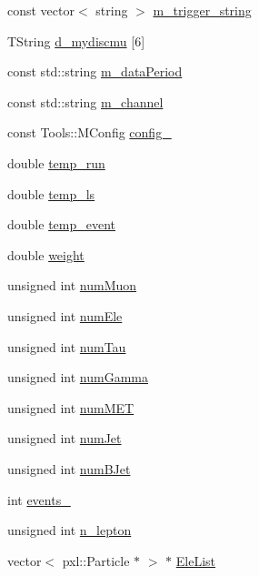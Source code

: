\begin{DoxyCompactItemize}
const vector$<$ string $>$ \hyperlink{classspecialAna_a4e5b506555aa75a4b132df95398a5ae5}{m\-\_\-trigger\-\_\-string}
\item 
T\-String \hyperlink{classspecialAna_a8bd00db3975c79baf92da5f720cca2fc}{d\-\_\-mydiscmu} \mbox{[}6\mbox{]}
\item 
const std\-::string \hyperlink{classspecialAna_a5962acc8cee4aa0fdb0f01caab08dd22}{m\-\_\-data\-Period}
\item 
const std\-::string \hyperlink{classspecialAna_a71e9557d5927332677564f33668e8c80}{m\-\_\-channel}
\item 
const Tools\-::\-M\-Config \hyperlink{classspecialAna_a1e76bd61bb4a97d99729f398674e14e2}{config\-\_\-}
\item 
double \hyperlink{classspecialAna_a739ec443ba622f962854c133080624db}{temp\-\_\-run}
\item 
double \hyperlink{classspecialAna_ad1c4dd4e6eb56e86c4ad24b8f942ebef}{temp\-\_\-ls}
\item 
double \hyperlink{classspecialAna_a70360bfdefab8b0cdfd126e40d109c34}{temp\-\_\-event}
\item 
double \hyperlink{classspecialAna_a093be544141cb52a9b5a1f5ef3bb7e32}{weight}
\item 
unsigned int \hyperlink{classspecialAna_af9324bf8986d292f34deeb070d0eccb1}{num\-Muon}
\item 
unsigned int \hyperlink{classspecialAna_a11b4167816b835bd2a729ebde0dc1098}{num\-Ele}
\item 
unsigned int \hyperlink{classspecialAna_a3f9a479af1480789df7ac7978b61cca5}{num\-Tau}
\item 
unsigned int \hyperlink{classspecialAna_a76c852b99af4a8890ab656c041fba8af}{num\-Gamma}
\item 
unsigned int \hyperlink{classspecialAna_a13da6896f59e970912c902579e3887e5}{num\-M\-E\-T}
\item 
unsigned int \hyperlink{classspecialAna_aa2601aeefa3374b37708442a41f9d876}{num\-Jet}
\item 
unsigned int \hyperlink{classspecialAna_af82a39567ee3dd6a4e5f5bfd439e3945}{num\-B\-Jet}
\item 
int \hyperlink{classspecialAna_aff5d8d0f950637c1d885ebfff0c3b9a8}{events\-\_\-}
\item 
unsigned int \hyperlink{classspecialAna_af80eb340f7aed6a1d0caa49d2b30a884}{n\-\_\-lepton}
\item 
vector$<$ pxl\-::\-Particle $\ast$ $>$ $\ast$ \hyperlink{classspecialAna_a20428604e5f83134e03ded624a4f4c6a}{Ele\-List}
\item 

\end{DoxyCompactItemize}
